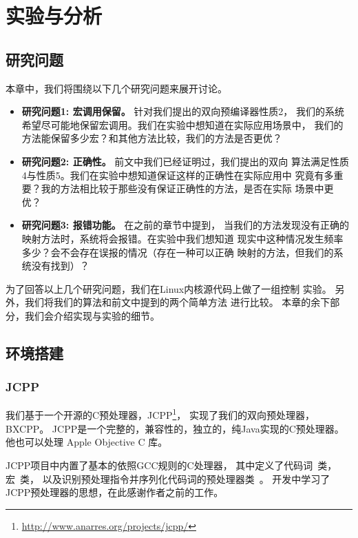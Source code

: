 \chapter{实验与分析}
\label{sec:evaluation}
\section{研究问题}
本章中，我们将围绕以下几个研究问题来展开讨论。
\begin{itemize}
\item {\bf 研究问题1: 宏调用保留。} 针对我们提出的双向预编译器性质2，
  我们的系统希望尽可能地保留宏调用。我们在实验中想知道在实际应用场景中，
  我们的方法能保留多少宏？和其他方法比较，我们的方法是否更优？
\item {\bf 研究问题2: 正确性。} 前文中我们已经证明过，我们提出的双向
  算法满足性质4与性质5。我们在实验中想知道保证这样的正确性在实际应用中
  究竟有多重要？我的方法相比较于那些没有保证正确性的方法，是否在实际
  场景中更优？
\item {\bf 研究问题3: 报错功能。}  在之前的章节中提到，
  当我们的方法发现没有正确的映射方法时，系统将会报错。在实验中我们想知道
  现实中这种情况发生频率多少？会不会存在误报的情况（存在一种可以正确
  映射的方法，但我们的系统没有找到）？
\end{itemize}

为了回答以上几个研究问题，我们在Linux内核源代码上做了一组控制
实验。
另外，我们将我们的算法和前文中提到的两个简单方法
进行比较。
本章的余下部分，我们会介绍实现与实验的细节。

\section{环境搭建}

\subsection{JCPP}
我们基于一个开源的C预处理器，JCPP\footnote{\url{http://www.anarres.org/projects/jcpp/}}，
实现了我们的双向预处理器，BXCPP。
JCPP是一个完整的，兼容性的，独立的，纯Java实现的C预处理器。
他也可以处理 Apple Objective C 库。

JCPP项目中内置了基本的依照GCC规则的C处理器，
其中定义了代码词~类，宏~类，
以及识别预处理指令并序列化代码词的预处理器类~。
开发中学习了JCPP预处理器的思想，在此感谢作者之前的工作。

